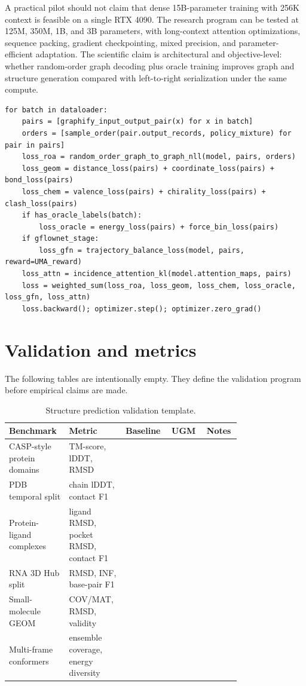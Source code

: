 \documentclass[11pt]{article}
\newcommand{\1}{\mathbf{1}}
\newcommand{\UGM}{\textsc{UGM}}
\begin{document}
A practical pilot should not claim that dense 15B-parameter training with 256K context is feasible on a single RTX 4090. The research program can be tested at 125M, 350M, 1B, and 3B parameters, with long-context attention optimizations, sequence packing, gradient checkpointing, mixed precision, and parameter-efficient adaptation. The scientific claim is architectural and objective-level: whether random-order graph decoding plus oracle training improves graph and structure generation compared with left-to-right serialization under the same compute.

\begin{lstlisting}[caption={Full multitask training loop.}]
for batch in dataloader:
    pairs = [graphify_input_output_pair(x) for x in batch]
    orders = [sample_order(pair.output_records, policy_mixture) for pair in pairs]
    loss_roa = random_order_graph_to_graph_nll(model, pairs, orders)
    loss_geom = distance_loss(pairs) + coordinate_loss(pairs) + bond_loss(pairs)
    loss_chem = valence_loss(pairs) + chirality_loss(pairs) + clash_loss(pairs)
    if has_oracle_labels(batch):
        loss_oracle = energy_loss(pairs) + force_bin_loss(pairs)
    if gflownet_stage:
        loss_gfn = trajectory_balance_loss(model, pairs, reward=UMA_reward)
    loss_attn = incidence_attention_kl(model.attention_maps, pairs)
    loss = weighted_sum(loss_roa, loss_geom, loss_chem, loss_oracle, loss_gfn, loss_attn)
    loss.backward(); optimizer.step(); optimizer.zero_grad()
\end{lstlisting}

\section{Validation and metrics}

The following tables are intentionally empty. They define the validation program before empirical claims are made.

\begin{table}[H]
\centering
\caption{Structure prediction validation template.}
\scriptsize
\setlength{\tabcolsep}{3pt}
\begin{tabular}{p{0.21\linewidth}p{0.20\linewidth}p{0.14\linewidth}p{0.14\linewidth}p{0.08\linewidth}}
\toprule
Benchmark & Metric & Baseline & \UGM & Notes \\
\midrule
CASP-style protein domains & TM-score, lDDT, RMSD & & & \\
PDB temporal split & chain lDDT, contact F1 & & & \\
Protein-ligand complexes & ligand RMSD, pocket RMSD, contact F1 & & & \\
RNA 3D Hub split & RMSD, INF, base-pair F1 & & & \\
Small-molecule GEOM & COV/MAT, RMSD, validity & & & \\
Multi-frame conformers & ensemble coverage, energy diversity & & & \\
\bottomrule
\end{tabular}
\end{table}
\end{document}
